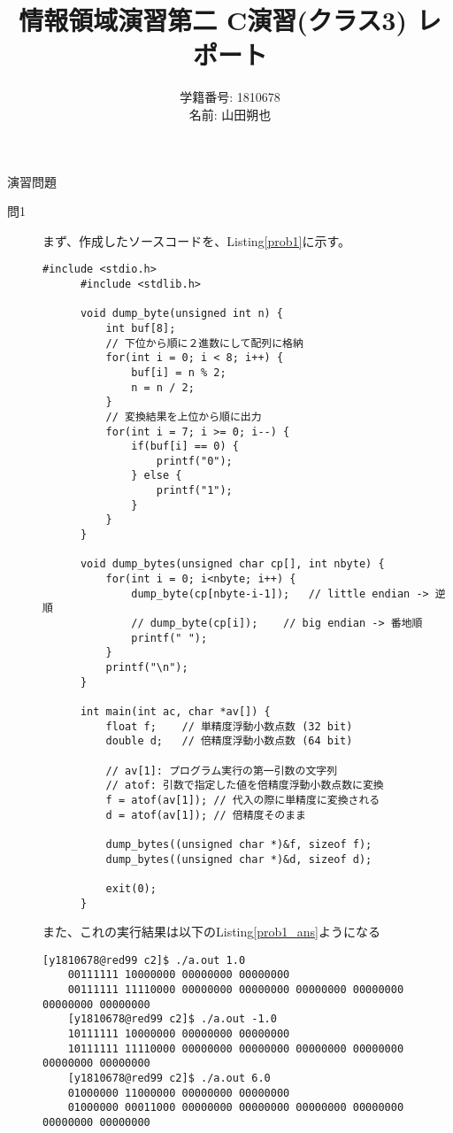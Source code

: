 \documentclass{jsarticle}
\title{情報領域演習第二 C演習(クラス3) レポート}
\author{学籍番号: 1810678 \\
        名前: 山田朔也}
\begin{document}
  \maketitle
  \noindent
  \large 演習問題
  \begin{description}
    \item[問1]
    まず、作成したソースコードを、Listing\ref{prob1}に示す。
    \begin{lstlisting}[caption=問1のソースコード, label=prob1]
      #include <stdio.h>
      #include <stdlib.h>

      void dump_byte(unsigned int n) {
          int buf[8];
          // 下位から順に２進数にして配列に格納
          for(int i = 0; i < 8; i++) {
              buf[i] = n % 2;
              n = n / 2;
          }
          // 変換結果を上位から順に出力
          for(int i = 7; i >= 0; i--) {
              if(buf[i] == 0) {
                  printf("0");
              } else {
                  printf("1");
              }
          }
      }

      void dump_bytes(unsigned char cp[], int nbyte) {
          for(int i = 0; i<nbyte; i++) {
              dump_byte(cp[nbyte-i-1]);   // little endian -> 逆順
              // dump_byte(cp[i]);    // big endian -> 番地順
              printf(" ");
          }
          printf("\n");
      }

      int main(int ac, char *av[]) {
          float f;    // 単精度浮動小数点数 (32 bit)
          double d;   // 倍精度浮動小数点数 (64 bit)

          // av[1]: プログラム実行の第一引数の文字列
          // atof: 引数で指定した値を倍精度浮動小数点数に変換
          f = atof(av[1]); // 代入の際に単精度に変換される
          d = atof(av[1]); // 倍精度そのまま

          dump_bytes((unsigned char *)&f, sizeof f);
          dump_bytes((unsigned char *)&d, sizeof d);

          exit(0);
      }
    \end{lstlisting}
    また、これの実行結果は以下のListing\ref{prob1_ans}ようになる
    \begin{lstlisting}[caption=問1の実行結果, label=prob1_ans]
    [y1810678@red99 c2]$ ./a.out 1.0
    00111111 10000000 00000000 00000000
    00111111 11110000 00000000 00000000 00000000 00000000 00000000 00000000
    [y1810678@red99 c2]$ ./a.out -1.0
    10111111 10000000 00000000 00000000
    10111111 11110000 00000000 00000000 00000000 00000000 00000000 00000000
    [y1810678@red99 c2]$ ./a.out 6.0
    01000000 11000000 00000000 00000000
    01000000 00011000 00000000 00000000 00000000 00000000 00000000 00000000
    \end{lstlisting}


\end{description}
\end{document}
